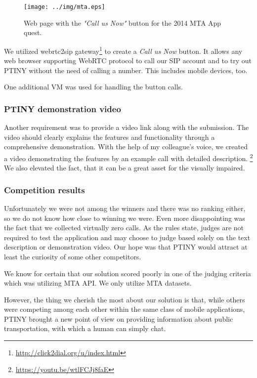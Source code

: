\begin{figure}[ht]
\centering
\texttt{[image: ../img/mta.eps]}
\caption{Web page with the \textit{"Call us Now"} button for the 2014 MTA App quest.}
\label{fig:mta}
\end{figure}

We utilized webrtc2sip gateway\footnote{\url{http://click2dial.org/u/index.html}} to create a \textit{Call us Now} button.
It allows any web browser supporting WebRTC protocol to call our SIP account and to try out PTINY without the need of calling a number.
This includes mobile devices, too.

One additional VM was used for handling the button calls.

\subsubsection{PTINY demonstration video}

Another requirement was to provide a video link along with the submission.
The video should clearly explains the features and functionality through a comprehensive demonstration.
With the help of my colleague's voice, we created a video demonstrating the features by an example call with detailed description. \footnote{\url{https://youtu.be/wtlFCJj8faE}}
We also elevated the fact, that it can be a great asset for the visually impaired.

\subsubsection{Competition results}

Unfortunately we were not among the winners and there was no ranking either, so we do not know how close to winning we were.
Even more disappointing was the fact that we collected virtually zero calls.
As the rules state, judges are not required to test the application and may choose to judge based solely on the text description or demonstration video.
Our hope was that PTINY would attract at least the curiosity of some other competitors.

We know for certain that our solution scored poorly in one of the judging criteria which was utilizing MTA API.
We only utilize MTA datasets.

However, the thing we cherish the most about our solution is that, while others were competing among each other within the same class of mobile applications, PTINY brought a new point of view on providing information about public transportation, with which a human can simply chat.

